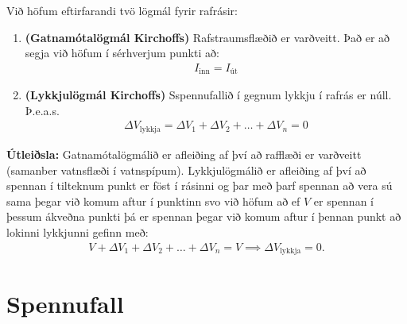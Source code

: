 \ifdefined \wholebook \else\documentclass[oneside]{book}\usepackage{EdlBook}\graphicspath{{figures/}}
\begin{document}
\begin{tcolorbox}
\begin{theorem}
Við höfum eftirfarandi tvö lögmál fyrir rafrásir:
\begin{enumerate}[label = \textbf{(\roman*)}]
    \item \textbf{(Gatnamótalögmál Kirchoffs)} Rafstraumsflæðið er varðveitt. Það er að segja við höfum í sérhverjum punkti að:
    \begin{align*}
        I_{\text{inn}} = I_{\text{út}}
    \end{align*}
    \item \textbf{(Lykkjulögmál Kirchoffs)} Sspennufallið í gegnum lykkju í rafrás er núll. Þ.e.a.s.~
    \begin{align*}
       \Delta V_{\text{lykkja}} = \Delta V_1 + \Delta V_2 + \ldots + \Delta V_n = 0
    \end{align*}
\end{enumerate}
\end{theorem}
\begin{figure}[H]
    \centering
\end{figure}
\end{tcolorbox}

\textbf{Útleiðsla:} Gatnamótalögmálið er afleiðing af því að rafflæði er varðveitt (samanber vatnsflæði í vatnspípum). Lykkjulögmálið er afleiðing af því að spennan í tilteknum punkt er föst í rásinni og þar með þarf spennan að vera sú sama þegar við komum aftur í punktinn svo við höfum að ef $V$ er spennan í þessum ákveðna punkti þá er spennan þegar við komum aftur í þennan punkt að lokinni lykkjunni gefinn með:
\begin{align*}
    V + \Delta V_1 + \Delta V_2 + \ldots + \Delta V_n = V \implies \Delta V_{\text{lykkja}} = 0.
\end{align*}

\section{Spennufall}
\end{document}
